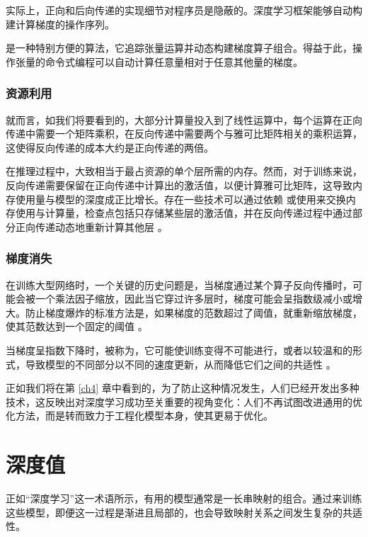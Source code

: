 实际上，正向和后向传递的实现细节对程序员是隐蔽的。深度学习框架能够自动构建计算梯度的操作序列。

 \citep{arxiv-1502.05767} 是一种特别方便的算法，它追踪张量运算并动态构建梯度算子组合。得益于此，操作张量的命令式编程可以自动计算任意量相对于任意其他量的梯度。

\subsubsection*{资源利用}

就而言，如我们将要看到的，大部分计算量投入到了线性运算中，每个运算在正向传递中需要一个矩阵乘积，在反向传递中需要两个与雅可比矩阵相关的乘积运算，这使得反向传递的成本大约是正向传递的两倍。

在推理过程中，大致相当于最占资源的单个层所需的内存。然而，对于训练来说，反向传递需要保留在正向传递中计算出的激活值，以便计算雅可比矩阵，这导致内存使用量与模型的深度成正比增长。存在一些技术可以通过依赖 \citep{arxiv-1707.04585} 或使用来交换内存使用与计算量，检查点包括只存储某些层的激活值，并在反向传递过程中通过部分正向传递动态地重新计算其他层 \citep{arxiv-1604.06174}。

\subsubsection*{梯度消失}

在训练大型网络时，一个关键的历史问题是，当梯度通过某个算子反向传播时，可能会被一个乘法因子缩放，因此当它穿过许多层时，梯度可能会呈指数级减小或增大。防止梯度爆炸的标准方法是，如果梯度的范数超过了阈值，就重新缩放梯度，使其范数达到一个固定的阈值 \citep{pascanu13}。

当梯度呈指数下降时，被称为，它可能使训练变得不可能进行，或者以较温和的形式，导致模型的不同部分以不同的速度更新，从而降低它们之间的共适性 \citep{glorot10a}。

正如我们将在第 \ref{ch4} 章中看到的，为了防止这种情况发生，人们已经开发出多种技术，这反映出对深度学习成功至关重要的视角变化：人们不再试图改进通用的优化方法，而是转而致力于工程化模型本身，使其更易于优化。

\section{深度值}\label{sec3.5}

正如``深度学习''这一术语所示，有用的模型通常是一长串映射的组合。通过来训练这些模型，即便这一过程是渐进且局部的，也会导致映射关系之间发生复杂的共适性。


